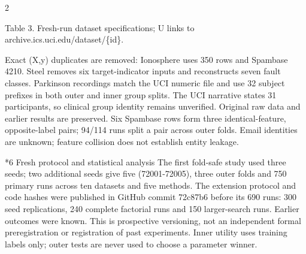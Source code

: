 \documentclass[10pt,a4paper]{article}
\makeatletter
\renewcommand{\section}{\@startsection{section}{1}{0pt}{5pt}{2pt}{\normalfont\normalsize\bfseries}}
\newcommand{\sect}[1]{\section*{#1}}
\makeatother
\begin{document}
\begin{multicols}{2}
\begin{minipage}{\linewidth}{\footnotesize Table 3. Fresh-run dataset specifications; U links to archive.ics.uci.edu/dataset/\{id\}.\par}
\end{minipage}\par\vspace{3pt}
Exact (X,y) duplicates are removed: Ionosphere uses 350 rows and Spambase 4210. Steel removes six target-indicator inputs and reconstructs seven fault classes. Parkinson recordings match the UCI numeric file and use 32 subject prefixes in both outer and inner group splits. The UCI narrative states 31 participants, so clinical group identity remains unverified. Original raw data and earlier results are preserved. Six Spambase rows form three identical-feature, opposite-label pairs; 94/114 runs split a pair across outer folds. Email identities are unknown; feature collision does not establish entity leakage.

\sect{6  Fresh protocol and statistical analysis}
The first fold-safe study used three seeds; two additional seeds give five (72001-72005), three outer folds and 750 primary runs across ten datasets and five methods. The extension protocol and code hashes were published in GitHub commit 72c87b6 before its 690 runs: 300 seed replications, 240 complete factorial runs and 150 larger-search runs. Earlier outcomes were known. This is prospective versioning, not an independent formal preregistration or registration of past experiments. Inner utility uses training labels only; outer tests are never used to choose a parameter winner.


\end{multicols}
\end{document}
